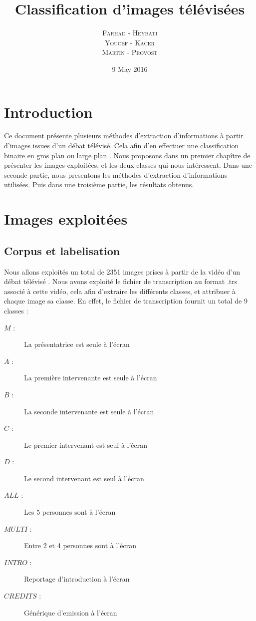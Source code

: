 \documentclass{book}
\title{Classification d'images télévisées}
\author{\textsc{Farhad} - \textsc{Heybati}\\
\textsc{Youcef} - \textsc{Kacer}\\
\textsc{Martin} - \textsc{Provost}}
\date{9 May 2016}
\begin{document}
 
\maketitle

\tableofcontents

\frontmatter
\chapter{Introduction}
Ce document présente plusieurs méthodes d'extraction d'informations à partir d'images issues d'un débat télévisé.
Cela afin d'en effectuer une classification binaire en \og gros plan \fg{} ou \og large plan \fg{}.
Nous proposons dans un premier chapître de présenter les images exploitées, et les deux classes qui nous intéressent.
Dans une seconde partie, nous presentons les méthodes d'extraction d'informations utilisées.
Puis dans une troisième partie, les résultats obtenus.

\mainmatter
\chapter{Images exploitées}
\section{Corpus et labelisation}
Nous allons exploités un total de 2351 images prises à partir de la vidéo d'un débat télévisé \cite{ref} .
Nous avons exploité le fichier de transcription au format .trs \cite{ref} associé à cette vidéo, cela afin d'extraire les différents classes, et attribuer à chaque image sa classe.
En effet, le fichier de transcription fournit un total de 9 classes : \\


\begin{description} %

\item[$M$ :] La présentatrice est seule à l'écran
\item[$A$ :] La première intervenante est seule à l'écran
\item[$B$ :] La seconde intervenante est seule à l'écran
\item[$C$ :] Le premier intervenant est seul à l'écran
\item[$D$ :] Le second intervenant est seul à l'écran
\item[$ALL$ :] Les 5 personnes sont à l'écran
\item[$MULTI$ :] Entre 2 et 4 personnes sont à l'écran
\item[$INTRO$ :] Reportage d'introduction à l'écran
\item[$CREDITS$ :] Générique d'emission à l'écran\\

\end{description}
\end{document}
